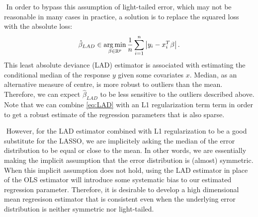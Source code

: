 $ $\newline
In order to bypass this assumption of light-tailed error, which may not be reasonable in many cases in practice, a solution is to replace the squared loss with the absolute loss:
\begin{align}
\hat{\beta}_{LAD} \in \argmin_{\beta\in\mathbb{R}^p} \frac{1}{n}\sum_{i=1}^n \left| y_i - x_i^T\beta \right|. \label{eq:LAD}
\end{align}
This least absolute deviance (LAD) estimator is associated with estimating the conditional median of the response $y$ given some covariates $x$. Median, as an alternative measure of centre, is more robust to outliers than the mean. Therefore, we can expect $\hat{\beta}_{LAD}$ to be less sensitive to the outliers described above. Note that we can combine \cref{eq:LAD} with an L1 regularization term term in order to get a robust estimate of the regression parameters that is also sparse.

$ $\newline
However, for the LAD estimator combined with L1 regularization to be a good substitute for the LASSO, we are implicitely asking the median of the error distribution to be equal or close to the mean. In other words, we are essentially making the implicit assumption that the error distribution is (almost) symmetric. When this implicit assumption does not hold, using the LAD estimator in place of the OLS estimator will introduce some systematic bias to our estimated regression parameter. Therefore, it is desirable to develop a high dimensional mean regresison estimator that is consistent even when the underlying error distribution is neither symmetric nor light-tailed.